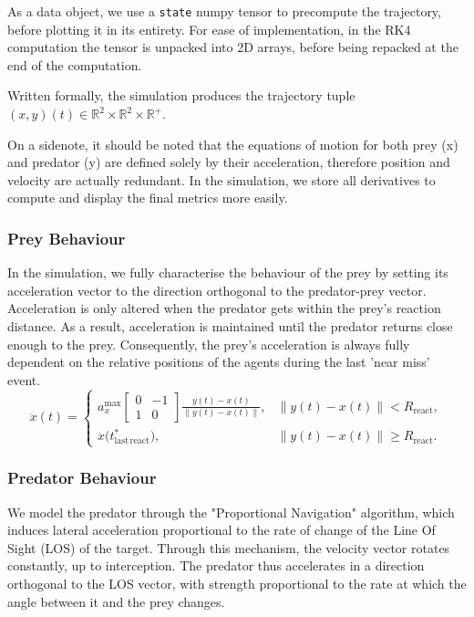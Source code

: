 \documentclass[11pt]{article}
\begin{document}
As a data object, we use a \texttt{state} numpy tensor to precompute the trajectory, before plotting it in its entirety. For ease of implementation, in the RK4 computation the tensor is unpacked into 2D arrays, before being repacked at the end of the computation.

Written formally, the simulation produces the trajectory tuple $(x,y)(t)\in \mathbb{R}^2 \times \mathbb{R}^2 \times \mathbb{R}^+$. 

On a sidenote, it should be noted that the equations of motion for both prey (x) and predator (y) are defined solely by their acceleration, therefore position and velocity are actually redundant. In the simulation, we store all derivatives to compute and display the final metrics more easily.

\subsubsection{Prey Behaviour}
In the simulation, we fully characterise the behaviour of the prey by setting its acceleration vector to the direction orthogonal to the predator-prey vector. Acceleration is only altered when the predator gets within the prey's reaction distance. As a result, acceleration is maintained until the predator returns close enough to the prey. Consequently, the prey's acceleration is always fully dependent on the relative positions of the agents during the last 'near miss' event.
\[
\ddot{x}(t) =
\begin{cases}
a_x^{\max}
\begin{bmatrix}
0 & -1\\
1 & 0
\end{bmatrix}
\displaystyle\frac{y(t) - x(t)}{\|y(t) - x(t)\|}, 
& \|y(t) - x(t)\| < R_{\mathrm{react}},\\[1.2em]
\ddot{x}\bigl(t^*_{\mathrm{last\,react}}\bigr), 
& \|y(t) - x(t)\| \ge R_{\mathrm{react}}.
\end{cases}
\]


\subsubsection{Predator Behaviour}
We model the predator through the "Proportional Navigation" algorithm, which induces lateral acceleration proportional to the rate of change of the Line Of Sight (LOS) of the target. Through this mechanism, the velocity vector rotates constantly, up to interception. The predator thus accelerates in a direction orthogonal to the LOS vector, with strength proportional to the rate at which the angle between it and the prey changes.
\end{document}
